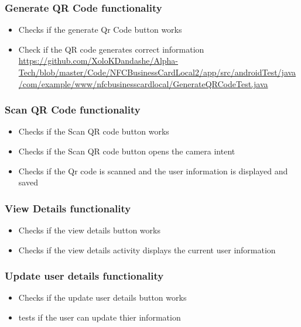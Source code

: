 \documentclass[english]{article}
\begin{document}
		\subsubsection{Generate QR Code functionality}
			\begin{itemize} 
				\item Checks if the generate Qr Code button works
				\item Check if the QR code generates correct information
				\\
					\href{url}{https://github.com/XoloKDandashe/Alpha-Tech/blob/master/Code/NFCBusinessCardLocal2/app/src/androidTest/java/com/example/www/nfcbusinesscardlocal/GenerateQRCodeTest.java}

			\end{itemize}
	\subsubsection{Scan QR Code functionality}
			\begin{itemize} 
				\item Checks if the Scan QR code button works
				\item Checks if the Scan QR code button opens the camera intent
				\item Checks if the Qr code is scanned and the user information is displayed and saved
\\
					\href{url}{}
			\end{itemize}
		\subsubsection{View Details functionality}
			\begin{itemize} 
				\item Checks if the view details button works
				\item Checks if the view details activity displays the current user information
\\
					\href{url}{}
			\end{itemize}
		\subsubsection{Update user details functionality}
			\begin{itemize} 
				\item Checks if the update user details button works
				\item tests if the user can update thier information
\\
					\href{url}{}
			\end{itemize}
\end{document}
